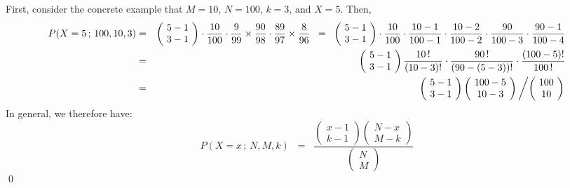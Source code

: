 First, consider the concrete example that $M = 10$, $N = 100$, $k = 3$, and $X = 5$.
Then,
\begin{eqnarray*}
         P(X = 5\,;\,100,10,3)
&=&      \left(\!\begin{array}{c} 5 - 1 \\ 3 - 1 \end{array}\!\right)
         \cdot \dfrac{10}{100}
         \cdot \dfrac{9}{99}
         \times\dfrac{90}{98}
         \cdot \dfrac{89}{97}
         \times\dfrac{8}{96}
\;\;=\;\;\left(\!\begin{array}{c} 5 - 1 \\ 3 - 1 \end{array}\!\right)
         \cdot\dfrac{10  }{100}
         \cdot\dfrac{10-1}{100-1}
         \cdot\dfrac{10-2}{100-2}
         \cdot\dfrac{90  }{100-3}
         \cdot\dfrac{90-1}{100-4}
\\
&=&      \left(\!\begin{array}{c} 5 - 1 \\ 3 - 1 \end{array}\!\right)
         \dfrac{10\,!}{(10-3)!} \cdot \dfrac{90\,!}{(90-(5-3))!} \cdot \dfrac{(100-5)!}{100\,!}
\\
&=&      \left(\!\begin{array}{c} 5 - 1 \\ 3 - 1 \end{array}\!\right)
         \left(\!\begin{array}{c} 100 - 5 \\ 10 - 3 \end{array}\!\right)
         \left/\left(\!\begin{array}{c} 100 \\ 10 \end{array}\!\right)\right.
\end{eqnarray*}
In general, we therefore have:
\begin{equation*}
P(X = x\,;\,N,M,k)
\;\; = \;\;
\dfrac{
\left(\!\begin{array}{c} x - 1 \\ k - 1 \end{array}\!\right)
\left(\!\begin{array}{c} N - x \\ M - k \end{array}\!\right)
}{
\left(\!\begin{array}{c} N \\ M \end{array}\!\right)
}
\end{equation*}
\qed
